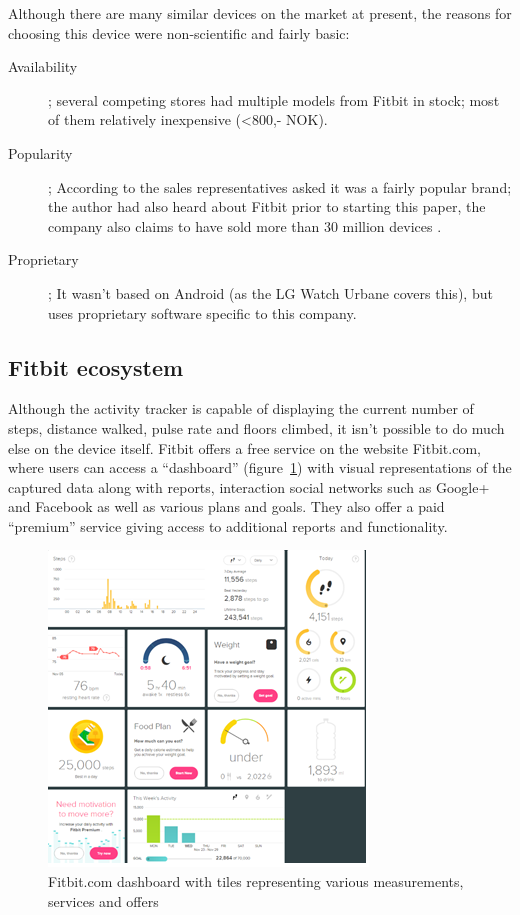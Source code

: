 \documentclass[a4paper,11pt,dvips]{article}
\begin{document}
Although there are many similar devices on the market at present, the reasons for choosing this device were non-scientific and fairly basic:

\begin{description}
\item[Availability]; several competing stores had multiple models from Fitbit in stock; most of them relatively inexpensive (<800,- NOK).
\item[Popularity]; According to the sales representatives asked it was a fairly popular brand; the author had also heard about Fitbit prior to starting this paper, the company also claims to have sold more than 30 million devices \citep{Fitbit:2015}.
\item[Proprietary]; It wasn't based on Android (as the LG Watch Urbane covers this), but uses proprietary software specific to this company.
\end{description}

\subsection{Fitbit ecosystem}
Although the activity tracker is capable of displaying the current number of steps, distance walked, pulse rate and floors climbed, it isn't possible to do much else on the device itself. Fitbit offers a free service on the website Fitbit.com, where users can access a “dashboard” (figure~\ref{fig:dash}) with visual representations of the captured data along with reports, interaction social networks such as Google+ and Facebook as well as various plans and goals. They also offer a paid “premium” service giving access to additional reports and functionality.

\begin{figure}
\begin{center}
\includegraphics[natwidth=321bp,natheight=317bp,width=0.6\linewidth]{dash}
\end{center}
\caption{Fitbit.com dashboard with tiles representing various measurements, services and offers}
\label{fig:dash}
\end{figure}
\end{document}
